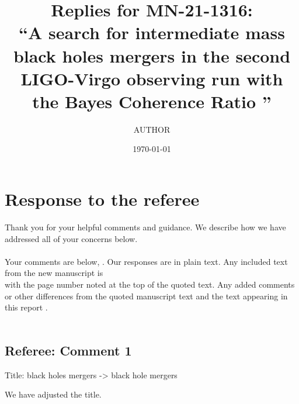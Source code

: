 \documentclass[11pt,leqno]{article}
\title{Replies for MN-21-1316:\\
 ``A search for intermediate mass black holes mergers in the second LIGO-Virgo observing run with the Bayes Coherence Ratio
''}
\author{AUTHOR}
\date{\today}
\begin{document}
\onehalfspacing


\section*{Response to the referee}
Thank you for your helpful comments and guidance. We describe how we have addressed all of your concerns below. \\
\\
Your comments are below,  . Our responses are in plain text. Any included text from the new manuscript is  \\
 with the page number noted at the top of the quoted text. 
Any added comments or other differences from the quoted manuscript text and the text appearing in this report {\color{red} {}}. \\
\\

\subsection*{Referee: Comment 1} 

\begin{tcolorbox}[left = 1em, top = 1ex, bottom = 1ex, colupper=black, colback=black!10, adjusted title = Referee: Comment 1]
    \setlength\parindent{2em}
	\noindent
	\ttfamily
	
	Title: black holes mergers -> black hole mergers
\end{tcolorbox}

We have adjusted the title.
\end{document}
